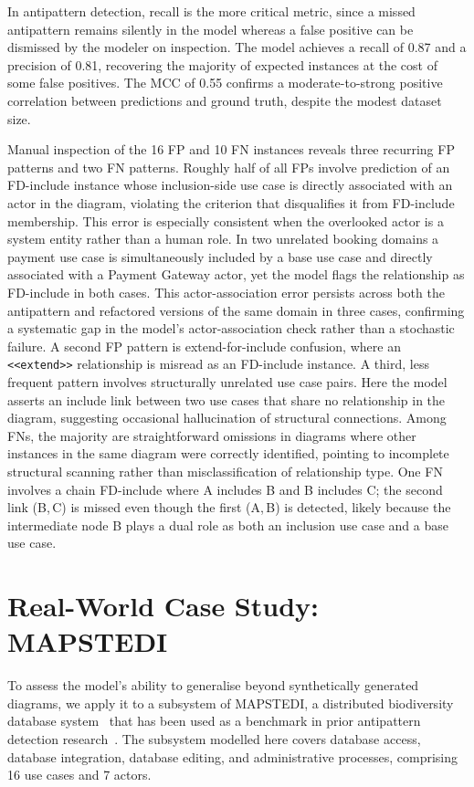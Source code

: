 \documentclass[sigconf,review,anonymous]{acmart}
\begin{document}
In antipattern detection, recall is the more critical metric, since a missed
antipattern remains silently in the model whereas a false positive can be
dismissed by the modeler on inspection.  The model achieves a recall of 0.87 and a precision of 0.81, recovering
the majority of expected instances at the cost of some false positives.  The MCC of 0.55 confirms a moderate-to-strong
positive correlation between predictions and ground truth, despite the modest
dataset size.

Manual inspection of the 16 FP and 10 FN instances reveals three recurring FP
patterns and two FN patterns.  Roughly half of all FPs involve prediction of an FD-include instance whose
inclusion-side use case is directly associated with an actor in the diagram,
violating the criterion that disqualifies it from FD-include membership.  This error is especially consistent when the overlooked actor is a system
entity rather than a human role.  In two unrelated booking domains a payment
use case is simultaneously included by a base use case and directly associated
with a Payment Gateway actor, yet the model flags the relationship as
FD-include in both cases.  This actor-association error persists across both
the antipattern and refactored versions of the same domain in three cases,
confirming a systematic gap in the model's
actor-association check rather than a stochastic failure.  A second FP pattern
is extend-for-include confusion, where an \texttt{<<extend>>} relationship is
misread as an FD-include instance.  A third, less frequent pattern involves
structurally unrelated use case pairs. Here the model asserts an include link
between two use cases that share no relationship in the diagram, suggesting
occasional hallucination of structural connections.  Among FNs, the majority
are straightforward omissions in diagrams where other instances in the same
diagram were correctly identified, pointing to incomplete structural scanning
rather than misclassification of relationship type.  One FN involves a chain FD-include where A includes B and B includes C;
the second link (B,\,C) is missed even though the first (A,\,B) is detected,
likely because the intermediate node B plays a dual role as both an inclusion
use case and a base use case.

\section{Real-World Case Study: MAPSTEDI}
\label{sec:mapstedi}

To assess the model's ability to generalise beyond synthetically generated
diagrams, we apply it to a subsystem of MAPSTEDI, a distributed biodiversity
database system~\cite{mapstedi} that has been used as a benchmark in prior
antipattern detection research~\cite{elattar2006matching,elattar2010improving}.  The
subsystem modelled here covers database access, database integration, database
editing, and administrative processes, comprising 16 use cases and 7 actors.
\end{document}
